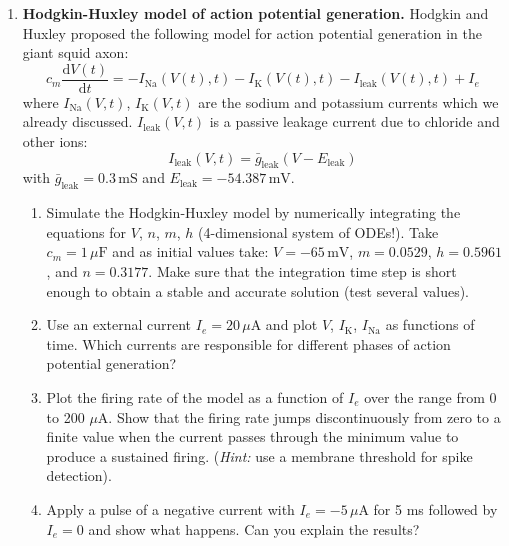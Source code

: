 \documentclass[12pt]{article}
\newcommand{\K}{\text{K}}
\newcommand{\Na}{\text{Na}}
\newcommand{\Leak}{\text{leak}}
\newcommand{\tderiv}[1]{\frac{\mathrm{d}#1}{\mathrm{d}t}}
\begin{document}
\begin{enumerate}

\item {\bf Hodgkin-Huxley model of action potential generation.}
Hodgkin and Huxley proposed the following model for action potential
generation in the giant squid axon:
\begin{equation}
    c_m \tderiv{V(t)}=-I_{\Na}(V(t), t) - I_{\K}(V(t), t) - I_{\Leak}(V(t),t)
+ I_e
    \label{eq:HHM}
\end{equation}
where $I_{\Na}(V,t)$, $I_{\K}(V,t)$ are the sodium and potassium currents
which we already discussed.  $I_{\Leak}(V,t)$ is a passive leakage current due
to chloride and other ions:
\begin{equation}
I_{\Leak}(V,t)=\bar{g}_{\Leak}(V-E_{\Leak})
\end{equation}
with $\bar{g}_{\Leak}=0.3\,\mathrm{mS}$ and
$E_{\Leak}=-54.387\,\mathrm{mV}$.

\begin{enumerate}
    \item Simulate the Hodgkin-Huxley model by numerically integrating the
        equations for $V$, $n$, $m$, $h$ (4-dimensional system of ODEs!). Take
        $c_m=1\,\mu\mathrm{F}$ and as initial values take:
        $V=-65\,\mathrm{mV}$, $m=0.0529$, $h=0.5961$, and $n=0.3177$. Make
        sure that the integration time step is
        short enough to obtain a stable and accurate solution (test several
        values).
  \item Use an external current $I_e=20\,\mu\mathrm{A}$ and plot $V$,
        $I_{\K}$, $I_{\Na}$ as functions of time. Which currents are
        responsible for different phases of action potential generation?
  \item Plot the firing rate of the model as a function of $I_e$ over
      the range from 0 to 200 $\mu$A. Show that the firing rate
      jumps discontinuously from zero to a finite value when the
      current passes through the minimum value to produce a sustained
      firing. (\textit{Hint:} use a membrane threshold for spike
      detection).
  \item Apply a pulse of a negative current with
      $I_e=-5\,\mu\mathrm{A}$ for 5 ms followed by $I_e=0$ and
      show what happens. Can you explain the results?
\end{enumerate}


\end{enumerate}
\end{document}
